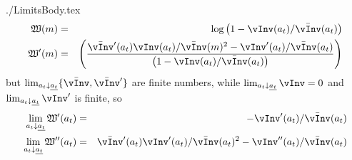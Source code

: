 \newcommand{\textname}{./Appendices/Limits}\documentclass{\econtex} \newcommand{\Mma}{{\it Mathematica}}
\begin{document}
 \large 
\begin{verbatimwrite}{./LimitsBody.tex}
\newcommand{\vPF}{\bar{\vInv}}
\newcommand{\cPF}{\bar{\cFunc}}
\newcommand{\W}{\mathfrak{W}}
\newcommand{\at}{a_{t}}
\newcommand{\atDown}{\lim_{\at \downarrow \underline{\at}}}
  \begin{eqnarray}
    \W(m) & = & \log \left(1-\vInv(\at)/\vPF(\at)\right) 
\\ \W^{\prime}(m) & = & \left(\frac{\vPF^{\prime}(\at)\vInv(\at)/\vPF(m)^2-\vInv^{\prime}(\at)/\vPF(\at)}{\left(1-\vInv(\at)/\vPF(\at)\right) }\right)
  \end{eqnarray}
but $\atDown \{\vPF,\vPF^{\prime}\}$ are finite numbers, while $\atDown \vInv = 0$ and $\atDown \vInv^{\prime}$ is finite, so
  \begin{eqnarray}
   \atDown \W^{\prime}(\at) & = & -\vInv^{\prime}(\at)/\vPF(\at)
\\ \atDown \W^{\prime\prime}(\at) & = & \vPF^{\prime}(\at)\vInv^{\prime}(\at)/\vPF(\at)^{2}-\vInv^{\prime\prime}(\at)/\vPF(\at  )
  \end{eqnarray}

\end{verbatimwrite}



\end{document}
